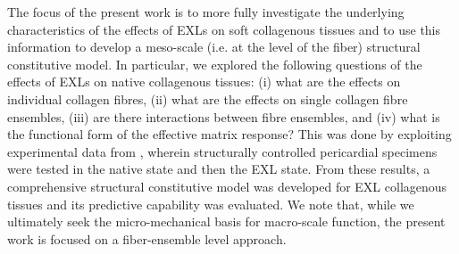     
    The focus of the present work is to more fully investigate the underlying characteristics of the effects of EXLs on soft collagenous tissues and to use this information to develop a meso-scale (i.e. at the level of the fiber) structural constitutive model. In particular, we explored the following questions of the effects of EXLs on native collagenous tissues: (i) what are the effects on individual collagen fibres, (ii) what are the effects on single collagen fibre ensembles, (iii) are there interactions between fibre ensembles, and (iv) what is the functional form of the effective matrix response? This was done by exploiting experimental data from \cite{sun_biaxial_2003}, wherein structurally controlled pericardial specimens were tested in the native state and then the EXL state. From these results, a comprehensive structural constitutive model was developed for EXL collagenous tissues and its predictive capability was evaluated. We note that, while we ultimately seek the micro-mechanical basis for macro-scale function, the present work is focused on a fiber-ensemble level approach.
    
    
    

